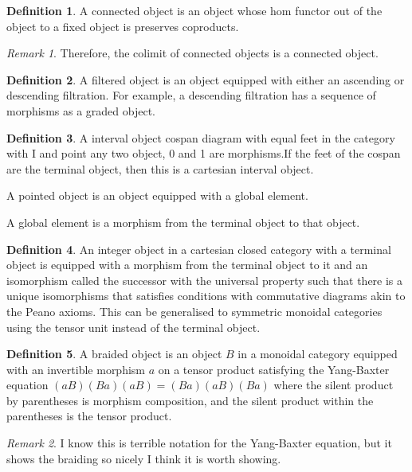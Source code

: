 \documentclass[10pt]{article}
\theoremstyle{plain}%
\theoremstyle{definition}
\newtheorem{definition}{Definition}[section]
\theoremstyle{remark}
\newtheorem*{remark}{Remark}
\begin{document}
\begin{definition}
    A connected object is an object whose hom functor out of the object to a fixed object is preserves coproducts.
\end{definition}

\begin{remark}
    Therefore, the colimit of connected objects is a connected object.
\end{remark}

\begin{definition}
    A filtered object is an object equipped with either an ascending or descending filtration. For example, a descending filtration has a sequence of morphisms as a graded object.
\end{definition}

\begin{definition}
    A interval object cospan diagram with equal feet in the category with I and point any two object, 0 and 1 are morphisms.If the feet of the cospan are the terminal object, then this is a cartesian interval object.

    A pointed object is an object equipped with a global element.

    A global element is a morphism from the terminal object to that object.
\end{definition}

\begin{definition}
    An integer object in a cartesian closed category with a terminal object is equipped with a morphism from the terminal object to it and an isomorphism called the successor with the universal property such that there is a unique isomorphisms that satisfies conditions with commutative diagrams akin to the Peano axioms. This can be generalised to symmetric monoidal categories using the tensor unit instead of the terminal object.
\end{definition}

\begin{definition}
    A braided object is an object $B$ in a monoidal category equipped with an invertible morphism $a$ on a tensor product satisfying the Yang-Baxter equation $(a B)(B a)(a B) = (B a)(a B)(B a)$ where the silent product by parentheses is morphism composition, and the silent product within the parentheses is the tensor product.
\end{definition}

\begin{remark}
    I know this is terrible notation for the Yang-Baxter equation, but it shows the braiding so nicely I think it is worth showing.
\end{remark}
\end{document}
